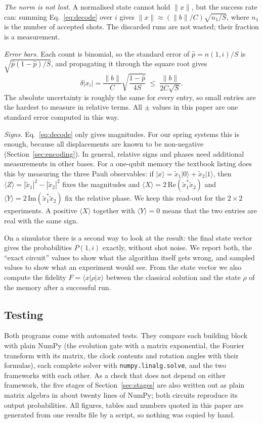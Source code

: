 \documentclass[manuscript,screen,review,nonacm]{acmart}
\newcommand{\ket}[1]{\lvert #1\rangle}
\newcommand{\bra}[1]{\langle #1\rvert}
\newcommand{\norm}[1]{\lVert #1\rVert}
\newcommand{\code}[1]{\texttt{#1}}
\begin{document}
\emph{The norm is not lost.} A normalised state cannot hold $\norm{x}$, but the
success rate can: summing Eq.~\eqref{eq:decode} over $i$ gives
$\norm{x}\approx(\norm{b}/C)\sqrt{n_1/S}$, where $n_1$ is the number of
accepted shots. The discarded runs are not wasted; their fraction is a
measurement.

\emph{Error bars.} Each count is binomial, so the standard error of
$\hat p=n(1,i)/S$ is $\sqrt{\hat p(1-\hat p)/S}$, and propagating it through
the square root gives
\begin{equation}
  \delta|x_i|=\frac{\norm{b}}{C}\sqrt{\frac{1-\hat p}{4S}}
  \;\le\;\frac{\norm{b}}{2C\sqrt{S}}.
  \label{eq:errorbar}
\end{equation}
The absolute uncertainty is roughly the same for every entry, so small entries
are the hardest to measure in relative terms. All $\pm$ values in this paper
are one standard error computed in this way.

\emph{Signs.} Eq.~\eqref{eq:decode} only gives magnitudes. For our spring
systems this is enough, because all displacements are known to be non-negative
(Section~\ref{sec:encoding}). In general, relative signs and phases need
additional measurements in other bases. For a one-qubit memory the textbook
listing does this by measuring the three Pauli observables: if
$\ket{x}=\tilde x_1\ket{0}+\tilde x_2\ket{1}$, then
$\langle Z\rangle=|\tilde x_1|^2-|\tilde x_2|^2$ fixes the magnitudes and
$\langle X\rangle=2\,\mathrm{Re}(\tilde x_1^{*}\tilde x_2)$ and
$\langle Y\rangle=2\,\mathrm{Im}(\tilde x_1^{*}\tilde x_2)$ fix the relative
phase. We keep this read-out for the $2\times 2$ experiments. A positive
$\langle X\rangle$ together with $\langle Y\rangle=0$ means that the two
entries are real with the same sign.

On a simulator there is a second way to look at the result: the final state
vector gives the probabilities $P(1,i)$ exactly, without shot noise. We report
both, the ``exact circuit'' values to show what the algorithm itself gets
wrong, and sampled values to show what an experiment would see. From the state
vector we also compute the fidelity $F=\bra{x}\rho\ket{x}$ between the
classical solution and the state $\rho$ of the memory after a successful run.

\subsection{Testing}

Both programs come with \NumTests{} automated tests. They compare each
building block with plain NumPy (the evolution gate with a matrix
exponential, the Fourier transform with its matrix, the clock contents and
rotation angles with their formulas), each complete solver with
\code{numpy.linalg.solve}, and the two frameworks with each other. As a check
that does not depend on either framework, the five stages of
Section~\ref{sec:stages} are also written out as plain matrix algebra in about
twenty lines of NumPy; both circuits reproduce its output probabilities. All
figures, tables and numbers quoted in this paper are generated from one results
file by a script, so nothing was copied by hand.
\end{document}
